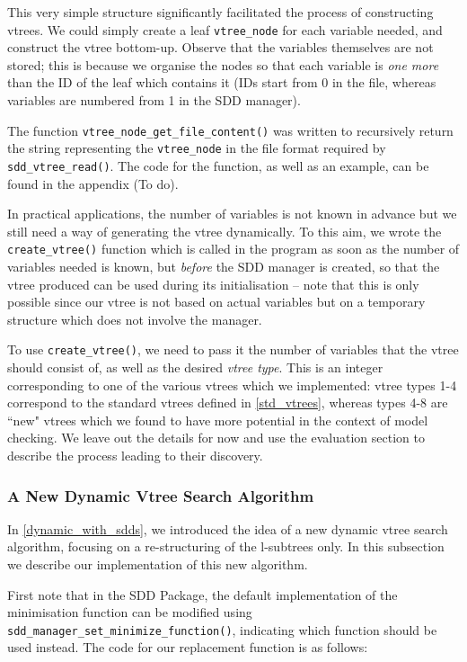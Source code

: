 \documentclass[11pt]{article}
\begin{document}
This very simple structure significantly facilitated the process of constructing vtrees. We could simply create a leaf \texttt{vtree\_node} for each variable needed, and construct the vtree bottom-up. Observe that the variables themselves are not stored; this is because we organise the nodes so that each variable is \textit{one more} than the ID of the leaf which contains it (IDs start from 0 in the file, whereas variables are numbered from 1 in the SDD manager).

 The function \texttt{vtree\_node\_get\_file\_content()} was written to recursively return the string representing the \texttt{vtree\_node} in the file format required by \texttt{sdd\_vtree\_read()}. The code for the function, as well as an example, can be found in the appendix (To do). 

In practical applications, the number of variables is not known in advance but we still need a way of generating the vtree dynamically. To this aim, we wrote the \texttt{create\_vtree()} function which is called in the program as soon as the number of variables needed is known, but \textit{before} the SDD manager is created, so that the vtree produced can be used during its initialisation -- note that this is only possible since our vtree is not based on actual variables but on a temporary structure which does not involve the manager. 

To use \texttt{create\_vtree()}, we need to pass it the number of variables that the vtree should consist of, as well as the desired \textit{vtree type}. This is an integer corresponding to one of the various vtrees which we implemented: vtree types 1-4 correspond to the standard vtrees defined in \ref{std_vtrees}, whereas types 4-8 are ``new" vtrees which we found to have more potential in the context of model checking. We leave out the details for now and use the evaluation section to describe the process leading to their discovery. 

\subsubsection{A New Dynamic Vtree Search Algorithm}

In \ref{dynamic_with_sdds}, we introduced the idea of a new dynamic vtree search algorithm, focusing on a re-structuring of the l-subtrees only. In this subsection we describe our implementation of this new algorithm.


First note that in the SDD Package, the default implementation of the minimisation function can be modified using \texttt{sdd\_manager\_set\_minimize\_function()},  indicating which function should be used instead.
The code for our replacement function is as follows: 
\end{document}

